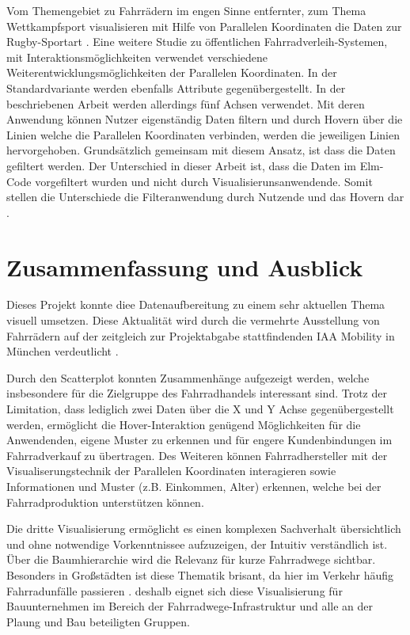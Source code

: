 \documentclass[usegeometry=true]{scrartcl}
\begin{document}
Vom Themengebiet zu Fahrrädern im engen Sinne entfernter, zum Thema Wettkampfsport visualisieren mit Hilfe von Parallelen Koordinaten die Daten zur Rugby-Sportart \cite{Du.2021,Chung.2016}.
Eine weitere Studie zu öffentlichen Fahrradverleih-Systemen, mit Interaktionsmöglichkeiten verwendet verschiedene Weiterentwicklungsmöglichkeiten der  Parallelen Koordinaten. In der Standardvariante werden ebenfalls Attribute gegenübergestellt. In der beschriebenen Arbeit werden allerdings fünf Achsen verwendet. Mit deren Anwendung können Nutzer eigenständig Daten filtern und durch Hovern über die Linien welche die Parallelen Koordinaten verbinden, werden die jeweiligen Linien hervorgehoben. Grundsätzlich gemeinsam mit diesem Ansatz, ist dass die Daten gefiltert werden. Der Unterschied in dieser Arbeit ist, dass die Daten im Elm-Code vorgefiltert wurden und nicht durch Visualisierunsanwendende. Somit stellen die Unterschiede die Filteranwendung durch Nutzende und das Hovern dar \cite{Shi.2018}.  
\section{Zusammenfassung und Ausblick}

Dieses Projekt konnte diee Datenaufbereitung zu einem sehr aktuellen Thema visuell umsetzen. Diese Aktualität wird durch die vermehrte Ausstellung von Fahrrädern auf der zeitgleich zur Projektabgabe stattfindenden IAA Mobility in München verdeutlicht \cite{.08.09.2021}.

Durch den Scatterplot konnten Zusammenhänge aufgezeigt werden, welche insbesondere für die Zielgruppe des Fahrradhandels interessant sind. Trotz der Limitation, dass lediglich zwei Daten über die X und Y Achse gegenübergestellt werden, ermöglicht die Hover-Interaktion genügend Möglichkeiten für die Anwendenden, eigene Muster zu erkennen und für engere Kundenbindungen im  Fahrradverkauf zu übertragen. 
Des Weiteren können Fahrradhersteller mit der Visualiserungstechnik der Parallelen Koordinaten interagieren sowie Informationen und Muster (z.B. Einkommen, Alter) erkennen, welche bei der Fahrradproduktion unterstützen können.

Die dritte Visualisierung ermöglicht es einen komplexen Sachverhalt übersichtlich und ohne notwendige Vorkenntnissee aufzuzeigen, der Intuitiv verständlich ist. Über die Baumhierarchie wird die Relevanz für kurze Fahrradwege sichtbar.
Besonders in Großstädten ist diese Thematik brisant, da hier im Verkehr häufig Fahrradunfälle passieren \cite{Reek.17.03.2021,Nogly.2014,tagesschau.20.08.2021}. deshalb eignet  sich diese Visualisierung für Bauunternehmen im Bereich der Fahrradwege-Infrastruktur und alle an der Plaung und Bau beteiligten Gruppen.
\end{document}
